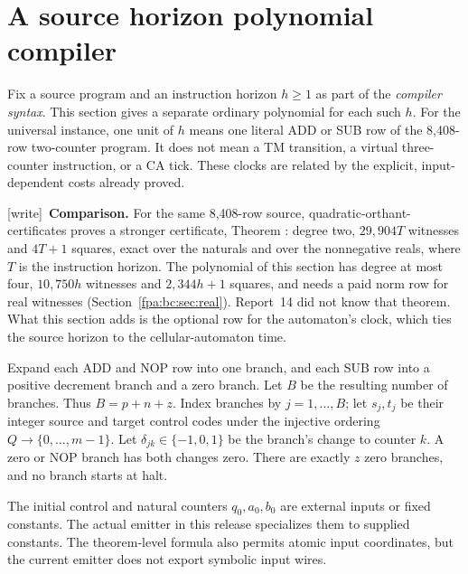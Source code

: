 \documentclass[11pt,a4paper]{article}
\numberwithin{equation}{section}
\newcommand{\wtag}{\textup{[write]}}
\begin{document}
\section{A source horizon polynomial compiler}\label{fpa:bc:sec:frontend}
Fix a source program and an instruction horizon $h\ge1$ as part of the
\emph{compiler syntax}. This section gives a separate ordinary polynomial for
each such $h$. For the universal instance, one unit of $h$ means one literal
ADD or SUB row of the 8,408-row two-counter program. It does not mean a TM
transition, a virtual three-counter instruction, or a CA tick. These clocks
are related by the explicit, input-dependent costs already proved.

\wtag\ \textbf{Comparison.} For the same 8,408-row source, quadratic-orthant-certificates proves a stronger certificate, Theorem : degree two, $29{,}904T$ witnesses and $4T+1$ squares, exact over the naturals and over the nonnegative reals, where $T$ is the instruction horizon. The polynomial of this section has degree at most four, $10{,}750h$ witnesses and $2{,}344h+1$ squares, and needs a paid norm row for real witnesses (Section~\ref{fpa:bc:sec:real}). Report~14 did not know that theorem. What this section adds is the optional row for the automaton's clock, which ties the source horizon to the cellular-automaton time.

Expand each ADD and NOP row into one branch, and each SUB row into a positive
decrement branch and a zero branch. Let $B$ be the resulting number of branches.
Thus $B=p+n+z$. Index branches by $j=1,\ldots,B$; let $s_j,t_j$ be their
integer source and target control codes under the injective ordering
$Q\to\{0,\ldots,m-1\}$. Let $\delta_{jk}\in\{-1,0,1\}$ be the branch's
change to counter $k$. A zero or NOP branch has both changes zero. There are
exactly $z$ zero branches, and no branch starts at halt.

The initial control and natural counters $q_0,a_0,b_0$ are external inputs
or fixed constants. The actual emitter in this release specializes them to
supplied constants. The theorem-level formula also permits atomic input
coordinates, but the current emitter does not export symbolic input wires.
\end{document}
